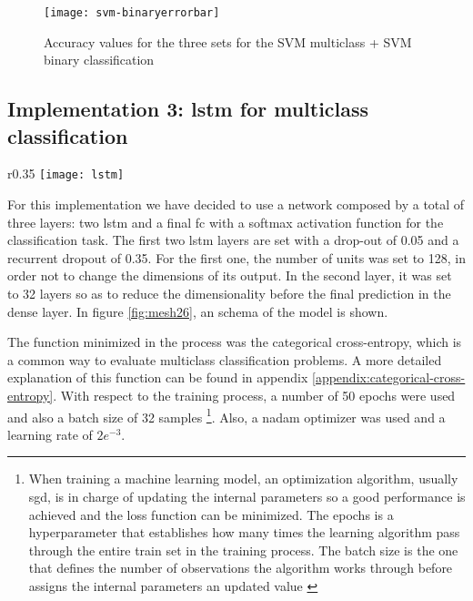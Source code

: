 	
	\begin{figure}[H]
		\centering
		\captionsetup{justification=centering}
		\texttt{[image: svm-binaryerrorbar]}
		\caption{Accuracy values for the three sets for the SVM multiclass + SVM binary classification}
		\label{fig:mesh25}
	\end{figure}
	
\subsection{Implementation 3: \acrshort{lstm} for multiclass classification}

	\begin{wrapfigure}{r}{0.35\textwidth}
		\centering
		\captionsetup{justification=centering}
		\texttt{[image: lstm]}
		\caption{LSTM architecture}
		\label{fig:mesh26}
	\end{wrapfigure}
	
	For this implementation we have decided to use a network composed by a total of three layers: two \acrshort{lstm} and a final \acrlong{fc} with a softmax activation function for the classification task. The first two \acrshort{lstm} layers are set with a drop-out of 0.05 and a recurrent dropout of 0.35. For the first one, the number of units was set to 128, in order not to change the dimensions of its output. In the second layer, it was set to 32 layers so as to reduce the dimensionality before the final prediction in the dense layer. In figure \ref{fig:mesh26}, an schema of the model is shown.
	
	The function minimized in the process was the categorical cross-entropy, which is a common way to evaluate multiclass classification problems. A more detailed explanation of this function can be found in appendix \ref{appendix:categorical-cross-entropy}. With respect to the training process, a number of 50 epochs were used and also a batch size of 32 samples \footnote{When training a machine learning model, an optimization algorithm, usually \acrshort{sgd}, is in charge of updating the internal parameters so a good performance is achieved and the loss function can be minimized. The epochs is a hyperparameter that establishes how many times the learning algorithm pass through the entire train set in the training process. The batch size is the one that defines the number of observations the algorithm works through before assigns the internal parameters an updated value \cite{Browniee2018a}}.  Also, a \acrshort{nadam} optimizer was used and a learning rate of $2e^{-3}$.
	
